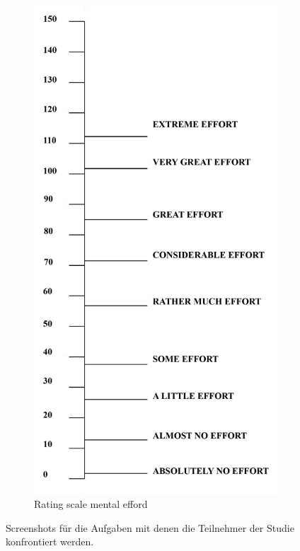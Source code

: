\begin{figure}
\begin{subfigure}{0.25\textwidth}
		\includegraphics[width=\textwidth]{./images/rsme.png}
		\caption{Rating scale mental efford}
		\label{fig:rsme_questionnaire}
	\end{subfigure}
	\caption{Screenshots für die Aufgaben mit denen die Teilnehmer der Studie konfrontiert werden.} %
\end{figure}

